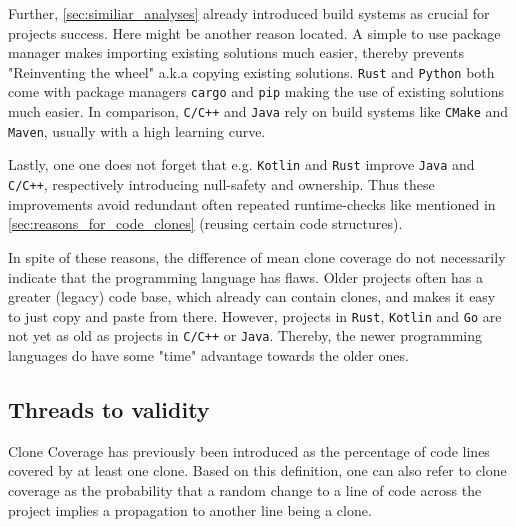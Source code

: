 Further, \autoref{sec:similiar_analyses} already introduced build systems as crucial for projects success. Here might be another reason located. A simple to use package manager makes importing existing solutions much easier, thereby prevents "Reinventing the wheel" a.k.a copying existing solutions. \texttt{Rust} and \texttt{Python} both come with package managers \texttt{cargo} and \texttt{pip} making the use of existing solutions much easier. In comparison, \texttt{C/C++} and \texttt{Java} rely on build systems like \texttt{CMake} and \texttt{Maven}, usually with a high learning curve.

Lastly, one one does not forget that e.g. \texttt{Kotlin} and \texttt{Rust} improve \texttt{Java} and \texttt{C/C++}, respectively introducing null-safety and ownership. Thus these improvements avoid redundant often repeated runtime-checks like mentioned in \autoref{sec:reasons_for_code_clones} (reusing certain code structures).

In spite of these reasons, the difference of mean clone coverage do not necessarily indicate that the programming language has flaws.
Older projects often has a greater (legacy) code base, which already can contain clones, and makes it easy to just copy and paste from there. However, projects in \texttt{Rust}, \texttt{Kotlin} and \texttt{Go} are not yet as old as projects in \texttt{C/C++} or \texttt{Java}. Thereby, the newer programming languages do have some "time" advantage towards the older ones.

 
\subsection{Threads to validity}

Clone Coverage has previously been introduced as the percentage of code lines covered by at least one clone. Based on this definition, one can also refer to clone coverage as the probability that a random change to a line of code across the project implies a propagation to another line being a clone.
 
